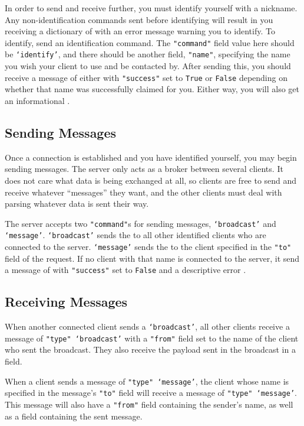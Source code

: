 \documentclass[12pt,letterpaper]{article}
\begin{document}
In order to send and receive further, you must identify yourself with a nickname. Any non-identification commands sent before identifying will result in you receiving a dictionary of \outcome  with an error message warning you to identify. To identify, send an identification command. The \texttt{"command"} field value here should be \texttt{`identify'}, and there should be another field, \texttt{"name"}, specifying the name you wish your client to use and be contacted by. After sending this, you should receive a message of \outcome either with \texttt{"success"} set to \texttt{True} or \texttt{False} depending on whether that name was successfully claimed for you. Either way, you will also get an informational \ttmessage.


\subsection{Sending Messages}
Once a connection is established and you have identified yourself, you may begin sending messages. The server only acts as a broker between several clients. It does not care what data is being exchanged at all, so clients are free to send and receive whatever ``messages'' they want, and the other clients must deal with parsing whatever data is sent their way.

The server accepts two \texttt{"command"}s for sending messages, \texttt{`broadcast'} and \texttt{`message'}. \texttt{`broadcast'} sends the \ttmessage to all other identified clients who are connected to the server. \texttt{`message'} sends the \ttmessage to the client specified in the \texttt{"to"} field of the request. If no client with that name is connected to the server, it send a message of \outcome  with \texttt{"success"}  set to \texttt{False}  and a descriptive error \ttmessage.

\subsection{Receiving Messages}
When another connected client sends a \texttt{`broadcast'}, all other clients receive a message of \texttt{"type" `broadcast'} with a \texttt{"from"} field set to the name of the client who sent the broadcast. They also receive the \ttmessage  payload sent in the broadcast in a \ttmessage field.

When a client sends a message of \texttt{"type" `message'}, the client whose name is specified in the message's \texttt{"to"} field will receive a message of \texttt{"type" `message'}. This message will also have a \texttt{"from"} field containing the sender's name, as well as a \ttmessage  field containing the sent message.
\end{document}
